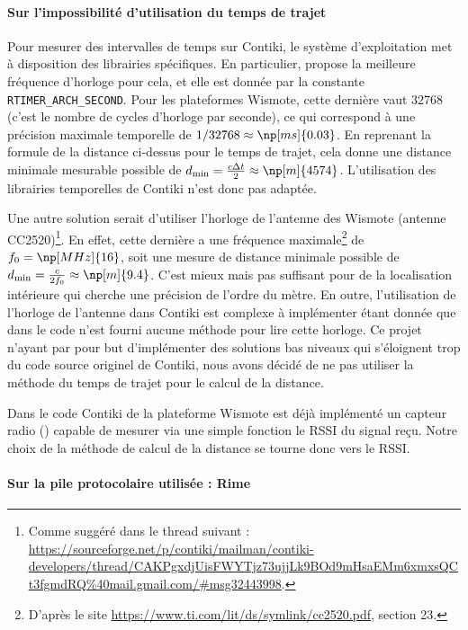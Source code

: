 \documentclass[french, a4paper, 12pt, parskip]{scrartcl}
\begin{document}
\paragraph{Sur l'impossibilité d'utilisation du temps de trajet}

Pour mesurer des intervalles de temps sur Contiki, le système d'exploitation met
à disposition des librairies spécifiques. En particulier, 
propose la meilleure fréquence d'horloge pour cela, et elle est donnée par la
constante \verb+RTIMER_ARCH_SECOND+. Pour les plateformes Wismote, cette
dernière vaut $32768$ (c'est le nombre de cycles d'horloge par seconde), ce qui
correspond à une précision maximale temporelle de $1/32768 \approx
\np[ms]{0.03}$. En reprenant la formule de la distance ci-dessus pour le temps
de trajet, cela donne une distance minimale mesurable possible de $d_{\min}
=\frac{c\Delta t}{2} \approx \np[m]{4574}$. L'utilisation des librairies
temporelles de Contiki n'est donc pas adaptée.

Une autre solution serait d'utiliser l'horloge de l'antenne des Wismote (antenne
CC2520)\footnote{Comme suggéré dans le thread suivant :
\url{https://sourceforge.net/p/contiki/mailman/contiki-developers/thread/CAKPgxdjUisFWYTjz73ujjLk9BOd9mHsaEMm6xmxsQCt3fgmdRQ\%40mail.gmail.com/\#msg32443998}.}.
En effet, cette dernière a une fréquence maximale\footnote{D'après le site
\url{https://www.ti.com/lit/ds/symlink/cc2520.pdf}, section 23.} de $f_0 =
\np[MHz]{16}$, soit une mesure de distance minimale possible de $d_{\min}
=\frac{c}{2f_0} \approx \np[m]{9.4}$. C'est mieux mais pas suffisant pour de la
localisation intérieure qui cherche une précision de l'ordre du mètre. En outre,
l'utilisation de l'horloge de l'antenne dans Contiki est complexe à implémenter
étant donnée que dans le code n'est fourni aucune méthode pour lire cette
horloge. Ce projet n'ayant par pour but d'implémenter des solutions bas niveaux
qui s'éloignent trop du code source originel de Contiki, nous avons décidé de ne
pas utiliser la méthode du temps de trajet pour le calcul de la distance.

Dans le code Contiki de la plateforme Wismote est déjà implémenté un capteur
radio () capable de mesurer via une
simple fonction le RSSI du signal reçu. Notre choix de la méthode de calcul de
la distance se tourne donc vers le RSSI.

\paragraph{Sur la pile protocolaire utilisée : Rime}
\end{document}
